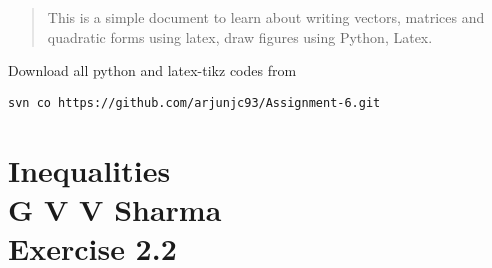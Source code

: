 \documentclass[journal,12pt,twocolumn]{IEEEtran}
\begin{document}
\newpage
\bigskip
\renewcommand{\thefigure}{\theenumi}
\renewcommand{\thetable}{\theenumi}
\begin{abstract}
This is a simple document to learn about writing vectors, matrices and quadratic forms using latex, draw figures using Python, Latex.
\end{abstract}
%
Download all python and latex-tikz codes from 
%
\begin{lstlisting}
svn co https://github.com/arjunjc93/Assignment-6.git
\end{lstlisting}
%
\section{Inequalities\\G V V Sharma\\Exercise 2.2}
\renewcommand{\theequation}{\theenumi}
\end{document}
